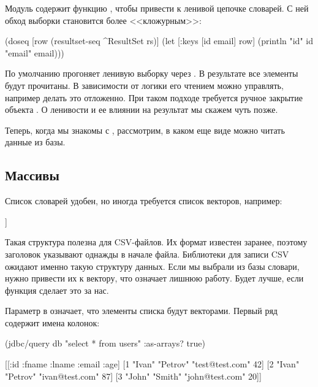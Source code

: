Модуль  содержит функцию , чтобы привести  к ленивой цепочке словарей. С ней обход выборки становится более <<кложурным>>:

\begin{english}
  \begin{clojure}
(doseq [row (resultset-seq ^ResultSet rs)]
  (let [{:keys [id email]} row]
    (println "id" id "email" email)))
  \end{clojure}
\end{english}

По умолчанию  прогоняет ленивую выборку через . В результате все элементы  будут прочитаны. В зависимости от логики его чтением можно управлять, например делать это отложенно. При таком подходе требуется ручное закрытие объекта . О ленивости и ее влиянии на результат мы скажем чуть позже.

Теперь, когда мы знакомы с , рассмотрим, в каком еще виде можно читать данные из базы.

\subsection{Массивы}

Список словарей удобен, но иногда требуется список векторов, например:

\begin{english}
  \begin{clojure}
[[1 "Ivan" "Petrov" "test@test.com"]
 [2 "Ivan" "Petrov" "ivan@test.com"]
 [3 "John" "Smith" "john@test.com"]]
  \end{clojure}
\end{english}


Такая структура полезна для CSV-файлов. Их формат известен заранее, поэтому заголовок указывают однажды в начале файла. Библиотеки для записи CSV ожидают именно такую структуру данных. Если мы выбрали из базы словари, нужно привести их к вектору, что означает лишнюю работу. Будет лучше, если функция  сделает это за нас.

Параметр  в  означает, что элементы списка будут векторами. Первый ряд содержит имена колонок:

\begin{english}
  \begin{clojure}
(jdbc/query db "select * from users" {:as-arrays? true})

[[:id :fname :lname :email :age]
 [1 "Ivan" "Petrov" "test@test.com" 42]
 [2 "Ivan" "Petrov" "ivan@test.com" 87]
 [3 "John" "Smith" "john@test.com" 20]]
  \end{clojure}
\end{english}

